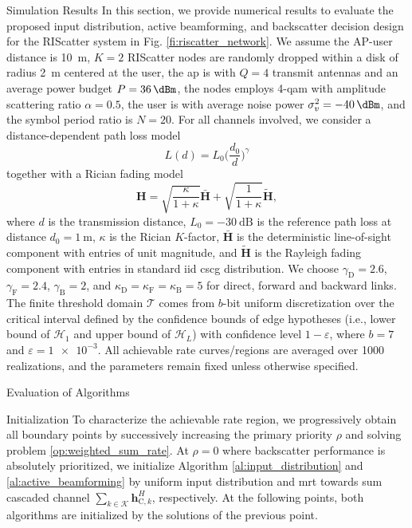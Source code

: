 \documentclass[journal]{IEEEtran}
\begin{document}
\begin{section}{Simulation Results}
	In this section, we provide numerical results to evaluate the proposed input distribution, active beamforming, and backscatter decision design for the RIScatter system in Fig. \ref{fi:riscatter_network}.
	We assume the AP-user distance is \qty{10}{\meter}, $K=2$ RIScatter nodes are randomly dropped within a disk of radius \qty{2}{\meter} centered at the user, the \gls{ap} is with $Q=4$ transmit antennas and an average power budget $P=\qty{36}{\dBm}$, the nodes employs \num{4}-\gls{qam} with amplitude scattering ratio $\alpha=0.5$, the user is with average noise power $\sigma_v^2=\qty{-40}{\dBm}$, and the symbol period ratio is $N=20$.
	For all channels involved, we consider a distance-dependent path loss model
	\begin{equation}
		L(d) = L_0 \biggl(\frac{d_0}{d}\biggr)^\gamma
	\end{equation}
	together with a Rician fading model
	\begin{equation}
		\boldsymbol{H} = \sqrt{\frac{\kappa}{1+\kappa}} \bar{\boldsymbol{H}} + \sqrt{\frac{1}{1+\kappa}} \tilde{\boldsymbol{H}},
	\end{equation}
	where $d$ is the transmission distance, $L_0=-\qty{30}{\dB}$ is the reference path loss at distance $d_0=\qty{1}{\meter}$, $\kappa$ is the Rician $K$-factor, $\bar{\boldsymbol{H}}$ is the deterministic line-of-sight component with entries of unit magnitude, and $\tilde{\boldsymbol{H}}$ is the Rayleigh fading component with entries in standard \gls{iid} \gls{cscg} distribution.
	We choose $\gamma_{\mathrm{D}}=2.6$, $\gamma_{\mathrm{F}}=2.4$, $\gamma_{\mathrm{B}}=2$, and $\kappa_{\mathrm{D}}=\kappa_{\mathrm{F}}=\kappa_{\mathrm{B}}=5$ for direct, forward and backward links.
	The finite threshold domain $\mathcal{T}$ comes from $b$-bit uniform discretization over the critical interval defined by the confidence bounds of edge hypotheses (i.e., lower bound of $\mathcal{H}_1$ and upper bound of $\mathcal{H}_L$) with confidence level $1-\varepsilon$, where $b=7$ and $\varepsilon=\num{1e-3}$.
	All achievable rate curves/regions are averaged over \num{1000} realizations, and the parameters remain fixed unless otherwise specified.

	\begin{subsection}{Evaluation of Algorithms}
		\begin{subsubsection}{Initialization}
			To characterize the achievable rate region, we progressively obtain all boundary points by successively increasing the primary priority $\rho$ and solving problem \eqref{op:weighted_sum_rate}.
			At $\rho=0$ where backscatter performance is absolutely prioritized, we initialize Algorithm \ref{al:input_distribution} and \ref{al:active_beamforming} by uniform input distribution and \gls{mrt} towards sum cascaded channel $\sum_{k \in \mathcal{K}} \boldsymbol{h}_{\mathrm{C},k}^H$, respectively.
			At the following points, both algorithms are initialized by the solutions of the previous point.
		\end{subsubsection}


\end{subsection}
\end{section}
\end{document}
